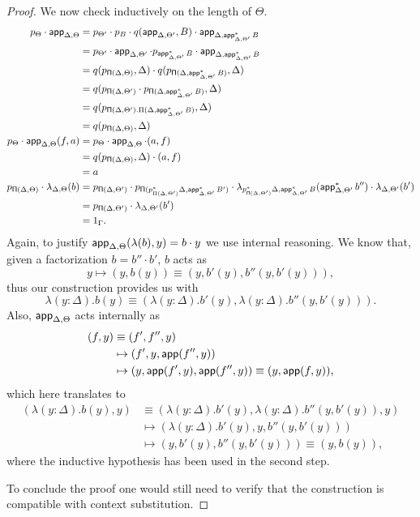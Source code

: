 \begin{proof}
  We now check inductively on the length of $\Theta$.
  \begin{align*}
    p_{\Theta}\cdot\operatorname{\mathsf{app}}_{\Delta,\Theta}
    &=p_{\Theta'}\cdot
    p_B\cdot
    q(\operatorname{\mathsf{app}}_{\Delta,\Theta'},B)\cdot
    \operatorname{\mathsf{app}}_{\Delta,\operatorname{\mathsf{app}}^*_{\Delta,\Theta'}B} \\
    &=p_{\Theta'}\cdot
    \operatorname{\mathsf{app}}_{\Delta,\Theta'}\cdot
    p_{\operatorname{\mathsf{app}}^*_{\Delta,\Theta'}B}\cdot
    \operatorname{\mathsf{app}}_{\Delta,\operatorname{\mathsf{app}}^*_{\Delta,\Theta'}B} \\
    &=q(p_{\operatorname{\mathsf{\Pi}}(\Delta,\Theta)},\Delta)\cdot
    q(p_{\operatorname{\mathsf{\Pi}}(\Delta,\operatorname{\mathsf{app}}^*_{\Delta,\Theta'}B)},\Delta) \\
    &=q(p_{\operatorname{\mathsf{\Pi}}(\Delta,\Theta')}\cdot
    p_{\operatorname{\mathsf{\Pi}}(\Delta,\operatorname{\mathsf{app}}^*_{\Delta,\Theta'}B)},\Delta) \\
    &=q(p_{\operatorname{\mathsf{\Pi}}(\Delta,\Theta').\Pi(\Delta,\operatorname{\mathsf{app}}^*_{\Delta,\Theta'}B)},\Delta) \\
    &=q(p_{\operatorname{\mathsf{\Pi}}(\Delta,\Theta)},\Delta) \\
    p_\Theta\cdot\operatorname{\mathsf{app}}_{\Delta,\Theta}(f,a)
    &=p_\Theta\cdot\operatorname{\mathsf{app}}_{\Delta,\Theta}\cdot(a,f) \\
    &=q(p_{\operatorname{\mathsf{\Pi}}(\Delta,\Theta)},\Delta)\cdot(a,f) \\
    &=a \\
    p_{\operatorname{\mathsf{\Pi}}(\Delta,\Theta)}\cdot
    \lambda_{\Delta,\Theta}(b)
    &=p_{\operatorname{\mathsf{\Pi}}(\Delta,\Theta')}\cdot
    p_{\operatorname{\mathsf{\Pi}}(p_{\Pi(\Delta,\Theta')}^*\Delta,\operatorname{\mathsf{app}}^*_{\Delta,\Theta'}B')}\cdot
    \lambda_{p^*_{\operatorname{\mathsf{\Pi}}(\Delta,\Theta')}\Delta,\operatorname{\mathsf{app}}^*_{\Delta,\Theta'}B}(\operatorname{\mathsf{app}}_{\Delta,\Theta'}^*b'')\cdot
    \lambda_{\Delta,\Theta'}(b') \\
    &=p_{\operatorname{\mathsf{\Pi}}(\Delta,\Theta')}\cdot
    \lambda_{\Delta,\Theta'}(b') \\
    &=1_\Gamma.
  \end{align*}
  Again, to justify
  $\operatorname{\mathsf{app}}_{\Delta,\Theta}(\lambda(b),y)=b\cdot y$ we use internal reasoning.
  We know that, given a factorization $b=b''\cdot b'$, $b$ acts as
  \[y\mapsto(y,b(y))\equiv(y,b'(y),b''(y,b'(y))),\]
  thus our construction provides us with
  \[\lambda(y:\Delta).b(y)\equiv
  (\lambda(y:\Delta).b'(y),\lambda(y:\Delta).b''(y,b'(y))).\]
  Also, $\operatorname{\mathsf{app}}_{\Delta,\Theta}$ acts internally as
  \begin{align*}
    (f,y)&\equiv(f',f'',y) \\
         &\mapsto(f',y,\operatorname{\mathsf{app}}(f'',y)) \\
         &\mapsto(y,\operatorname{\mathsf{app}}(f',y),\operatorname{\mathsf{app}}(f'',y))
         \equiv(y,\operatorname{\mathsf{app}}(f,y)),
  \end{align*}
  which here translates to
  \begin{align*}
    (\lambda(y:\Delta).b(y),y)
    &\equiv(\lambda(y:\Delta).b'(y),\lambda(y:\Delta).b''(y,b'(y)),y) \\
    &\mapsto(\lambda(y:\Delta).b'(y),y,b''(y,b'(y))) \\
    &\mapsto(y,b'(y),b''(y,b'(y)))\equiv(y,b(y)),
  \end{align*}
  where the inductive hypothesis has been used in the second step.

  To conclude the proof one would still need to verify that the construction is
  compatible with context substitution.
\end{proof}



